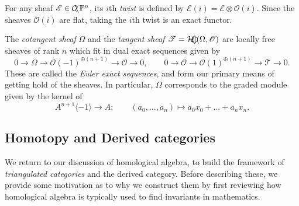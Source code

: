 \documentclass[a4paper]{article}
\theoremstyle{definition}
\theoremstyle{remark}
\DeclareMathOperator{\Homsh}{\mathcal{H\kern -3pt o\kern -2pt m\kern -1pt}}
\newcommand{\Pn}{\ensuremath{{\mathbb{P}^n}}}
\DeclareMathOperator{\coh}{\mathcal{C\kern -2pt o\kern -2pt h\kern -1pt}}
\begin{document}
For any sheaf \({\mathscr{E}\in \coh\Pn}\), its \(i\)th \textit{twist} is defined by
\(\mathscr{E}(i)= \mathscr{E}\otimes \mathscr{O}(i).\) Since the sheaves
\(\mathscr{O}(i)\) are flat, taking the \(i\)th twist is an exact functor.

The \textit{cotangent sheaf} \(\Omega\) and the \textit{tangent sheaf}
\(\mathscr{T}=\Homsh(\Omega, \mathscr{O})\) are locally free sheaves of rank
\(n\) which fit in dual exact sequences given by
\begin{equation} \label{eulerexactsequence}
    0\rightarrow \Omega \rightarrow \mathscr{O}(-1)^{\oplus(n+1)} \rightarrow
    \mathscr{O}\rightarrow 0, \qquad
    0\rightarrow \mathscr{O}\rightarrow \mathscr{O}(1)^{\oplus(n+1)}\rightarrow
    \mathscr{T}\rightarrow 0.
\end{equation}
These are called the \textit{Euler exact sequences}, and form our primary means
of getting hold of the sheaves. In particular, \(\Omega\) corresponds to the
graded module given by the kernel of 
\[A^{n+1}\langle -1 \rangle\longrightarrow A; \qquad (a_0,...,a_n)\longmapsto
a_0x_0+...+a_nx_n.\]

\subsection{Homotopy and Derived categories}

We return to our discussion of homological algebra, to build the framework of
\textit{triangulated categories} and the derived category. Before describing
these, we provide some motivation as to why we construct them by first reviewing
how homological algebra is typically used to find invariants in mathematics.
\end{document}

